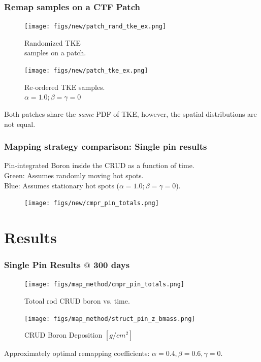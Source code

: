 \documentclass[t, pdftex]{beamer}
\begin{document}
\begin{frame}
\frametitle{Remap samples on a CTF Patch}
    \begin{figure}
        \centering
        \begin{minipage}{.5\textwidth}
            \centering
            \texttt{[image: figs/new/patch\_rand\_tke\_ex.png]}
            \caption{\centering Randomized TKE \\  samples on a patch.}
        \end{minipage}%
        \begin{minipage}{.5\textwidth}
            \centering
            \texttt{[image: figs/new/patch\_tke\_ex.png]}
            \caption{\centering Re-ordered TKE samples. \\ $\alpha=1.0; \beta=\gamma=0$}
        \end{minipage}
    \end{figure}
Both patches share the \emph{same} PDF of TKE, however, the spatial distributions are not equal.
\end{frame}

\begin{frame}
\frametitle{Mapping strategy comparison: Single pin results}
\tiny{
Pin-integrated Boron inside the CRUD as a function of time.  \\ 
{\color{green} Green: Assumes randomly moving hot spots.} \\
{\color{blue} Blue: Assumes stationary hot spots ($\alpha=1.0; \beta=\gamma=0$).}
}
\begin{figure}[!htbp]
\centering
\texttt{[image: figs/new/cmpr\_pin\_totals.png]}
\label{model_overview}
\end{figure}
\end{frame}


\section{Results}
\begin{frame}
\frametitle{Single Pin Results $@$ 300 days}
    \begin{figure}
        \centering
        \begin{minipage}{.5\textwidth}
            \centering
            \texttt{[image: figs/map\_method/cmpr\_pin\_totals.png]}
            \caption{Totoal rod CRUD boron vs. time.}
        \end{minipage}%
        \begin{minipage}{.5\textwidth}
            \centering
            \texttt{[image: figs/map\_method/struct\_pin\_z\_bmass.png]}
            \caption{ CRUD Boron Deposition $[g/cm^2]$}
        \end{minipage}
    \end{figure}
Approximately optimal remapping coefficients: $\alpha=0.4, \beta=0.6, \gamma=0$.  
\end{frame}
\end{document}
